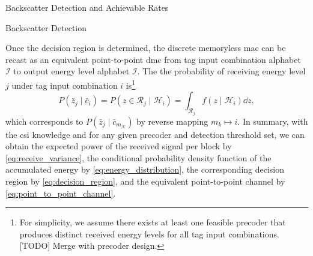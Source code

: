\documentclass[journal]{IEEEtran}
\newtheorem{remark}{Remark}
\begin{document}
\begin{section}{Backscatter Detection and Achievable Rates}
\begin{subsection}{Backscatter Detection}


			Once the decision region is determined, the discrete memoryless \gls{mac} can be recast as an equivalent point-to-point \gls{dmc} from tag input combination alphabet $\mathcal{I}$ to output energy level alphabet $\mathcal{I}$. The the probability of receiving energy level $j$ under tag input combination $i$ is\footnote{For simplicity, we assume there exists at least one feasible precoder that produces distinct received energy levels for all tag input combinations. [TODO] Merge with precoder design.}
			\begin{equation}
				P(\bar{z}_j \mid \bar{c}_i) = P(z \in \mathcal{R}_j \mid \mathcal{H}_i) = \int_{\mathcal{R}_j} f(z \mid \mathcal{H}_i) \dd z,
				\label{eq:point_to_point_channel}
			\end{equation}
			which corresponds to $P(\bar{z}_j \mid \bar{c}_{m_{\mathcal{K}}})$ by reverse mapping $m_k \mapsto i$. In summary, with the \gls{csi} knowledge and for any given precoder and detection threshold set, we can obtain the expected power of the received signal per block by \eqref{eq:receive_variance}, the conditional probability density function of the accumulated energy by \eqref{eq:energy_distribution}, the corresponding decision region by \eqref{eq:decision_region}, and the equivalent point-to-point channel by \eqref{eq:point_to_point_channel}.
		\end{subsection}


\end{section}
\end{document}
